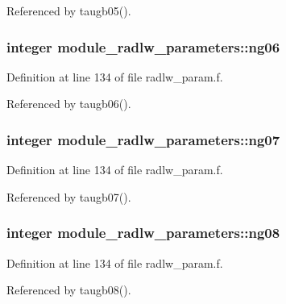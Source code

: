 Referenced by taugb05().

\subsubsection[{\texorpdfstring{ng06}{ng06}}]{\setlength{\rightskip}{0pt plus 5cm}integer module\+\_\+radlw\+\_\+parameters\+::ng06}\hypertarget{group__module__radlw__main_ga9a176786a0df1e65165db9b3c6f0e582}{}\label{group__module__radlw__main_ga9a176786a0df1e65165db9b3c6f0e582}


Definition at line 134 of file radlw\+\_\+param.\+f.



Referenced by taugb06().

\subsubsection[{\texorpdfstring{ng07}{ng07}}]{\setlength{\rightskip}{0pt plus 5cm}integer module\+\_\+radlw\+\_\+parameters\+::ng07}\hypertarget{group__module__radlw__main_gab8f22f9ceabf3946452055c461476d49}{}\label{group__module__radlw__main_gab8f22f9ceabf3946452055c461476d49}


Definition at line 134 of file radlw\+\_\+param.\+f.



Referenced by taugb07().

\subsubsection[{\texorpdfstring{ng08}{ng08}}]{\setlength{\rightskip}{0pt plus 5cm}integer module\+\_\+radlw\+\_\+parameters\+::ng08}\hypertarget{group__module__radlw__main_ga61aba0726187e15acf8bae5c377dbdd5}{}\label{group__module__radlw__main_ga61aba0726187e15acf8bae5c377dbdd5}


Definition at line 134 of file radlw\+\_\+param.\+f.



Referenced by taugb08().

